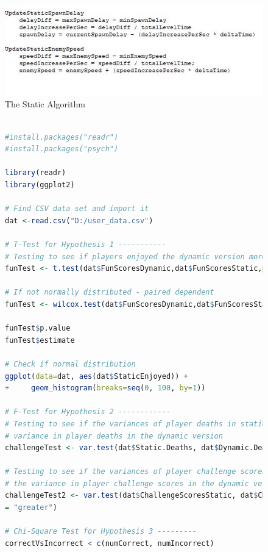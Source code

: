 \documentclass[journal]{IEEEtran}
\begin{document}
\begin{figure}[h]
	\includegraphics[width=2.0\linewidth]{pseudocodestatic.jpg}
	\caption{The Static Algorithm}
	\label{fig::24}
\end{figure} 

\begin{center}
\begin{figure}

\begin{lstlisting}[language=R]

#install.packages("readr")
#install.packages("psych")

library(readr)
library(ggplot2)

# Find CSV data set and import it
dat <-read.csv("D:/user_data.csv")

# T-Test for Hypothesis 1 -----------
# Testing to see if players enjoyed the dynamic version more than the static
funTest <- t.test(dat$FunScoresDynamic,dat$FunScoresStatic,paired=TRUE, alternative="greater")

# If not normally distributed - paired dependent
funTest <- wilcox.test(dat$FunScoresDynamic,dat$FunScoresStatic, paired = TRUE,  alternative="greater")

funTest$p.value
funTest$estimate

# Check if normal distribution
ggplot(data=dat, aes(dat$StaticEnjoyed)) + 
+     geom_histogram(breaks=seq(0, 100, by=1))

# F-Test for Hypothesis 2 ------------
# Testing to see if the variances of player deaths in static version is higher than the 
# variance in player deaths in the dynamic version
challengeTest <- var.test(dat$Static.Deaths, dat$Dynamic.Deaths, alternative = "greater")

# Testing to see if the variances of player challenge scores in static version is higher than 
# the variance in player challenge scores in the dynamic version
challengeTest2 <- var.test(dat$ChallengeScoresStatic, dat$ChallengeScoresDynamic, alternative
= "greater")

# Chi-Square Test for Hypothesis 3 ---------
correctVsIncorrect < c(numCorrect, numIncorrect)


\end{lstlisting}
\end{figure}
\end{center}
\end{document}
